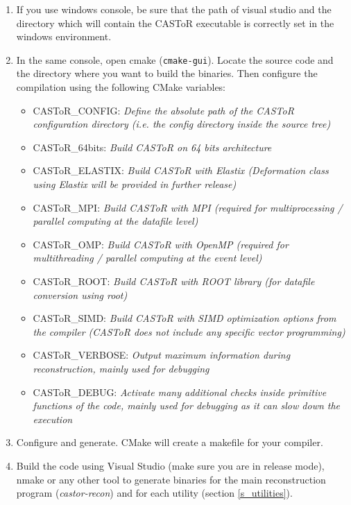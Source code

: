 \documentclass[a4paper, 11pt]{article}
\begin{document}
\begin{enumerate}
  \item If you use windows console, be sure that the path of visual studio and the directory which will contain the CASToR executable is correctly set in the windows environment.
  \item In the same console, open cmake (\verb|cmake-gui|). Locate the source code and the directory where you want to build the binaries.
        Then configure the  compilation using the following CMake variables:
  \begin{itemize}
    \item CASToR\_CONFIG:  \textit{Define the absolute path of the CASToR configuration directory (\textit{i.e.} the \textit{config} directory inside the source tree)}
    \item CASToR\_64bits:  \textit{Build CASToR on 64 bits architecture}
    \item CASToR\_ELASTIX: \textit{Build CASToR with Elastix (Deformation class using Elastix will be provided in further release)}
    \item CASToR\_MPI:     \textit{Build CASToR with MPI (required for multiprocessing / parallel computing at the datafile level)}
    \item CASToR\_OMP:     \textit{Build CASToR with OpenMP (required for multithreading / parallel computing at the event level)}
    \item CASToR\_ROOT:    \textit{Build CASToR with ROOT library (for datafile conversion using root)}
    \item CASToR\_SIMD:    \textit{Build CASToR with SIMD optimization options from the compiler (CASToR does not include any specific vector programming)}
    \item CASToR\_VERBOSE: \textit{Output maximum information during reconstruction, mainly used for debugging}
    \item CASToR\_DEBUG:   \textit{Activate many additional checks inside primitive functions of the code, mainly used for debugging as it can slow down the execution}
  \end{itemize}
  \item Configure and generate. CMake will create a makefile for your compiler.
  \item Build the code using Visual Studio (make sure you are in release mode), nmake or any other tool to generate binaries for the main reconstruction program (\textit{castor-recon}) and for each utility (section \ref{s_utilities}).
\end{enumerate}
\end{document}
